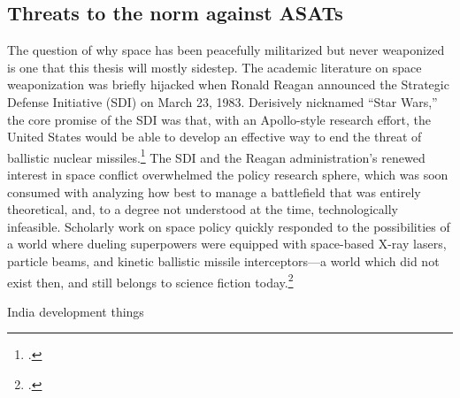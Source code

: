 \documentclass{memoir}
\begin{document}
\subsection{Threats to the norm against ASATs}
The question of why space has been peacefully militarized but never weaponized is one that this thesis will mostly sidestep. The academic literature on space weaponization was briefly hijacked when Ronald Reagan announced the Strategic Defense Initiative (SDI) on March 23, 1983. Derisively nicknamed ``Star Wars,'' the core promise of the SDI was that, with an Apollo-style research effort, the United States would be able to develop an effective way to end the threat of ballistic nuclear missiles.\footcite{reagan_address_1983} The SDI and the Reagan administration's renewed interest in space conflict overwhelmed the policy research sphere, which was soon consumed with analyzing how best to manage a battlefield that was entirely theoretical, and, to a degree not understood at the time, technologically infeasible. Scholarly work on space policy quickly responded to the possibilities of a world where dueling superpowers were equipped with space-based X-ray lasers, particle beams, and kinetic ballistic missile interceptors---a world which did not exist then, and still belongs to science fiction today.\footcite[p.~1-2]{mowthorpe_militarization_2004}


India development things


\end{document}
